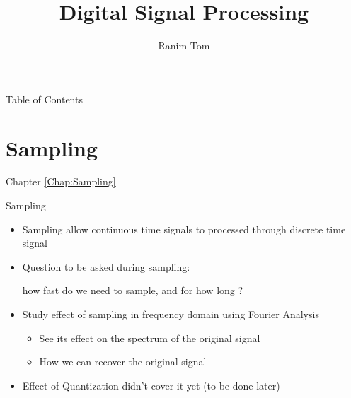 \documentclass{beamer}
\title[Acronym]{Digital Signal Processing}
\author{Ranim Tom}
\date[]
\begin{document}

\begin{frame}
\titlepage
\end{frame}


\begin{frame}[t,allowframebreaks]{Table of Contents}
\tableofcontents
\end{frame}







\section{Sampling}
\label{Chap:Sampling}
\begin{frame}[t]{Chapter \autoref{Chap:Sampling}}
\tableofcontents[sections= \value{section}]
\end{frame}


\begin{frame}[t]{Sampling}

\begin{itemize}

\item Sampling allow continuous time signals to processed through discrete time signal

\item Question to be asked during sampling: 

how fast do we need to sample, and for how long ?

\item Study effect of sampling in frequency domain using Fourier Analysis

	\begin{itemize}
	\item See its effect on the spectrum of the original signal
	
	\item How we can recover the original signal
	\end{itemize}


\item Effect of Quantization didn't cover it yet (to be done later)

\end{itemize}



\end{frame}
\end{document}
